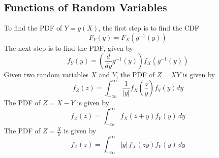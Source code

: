 \documentclass[nobib]{tufte-handout}
\begin{document}
\subsection{Functions of Random Variables}
To find the PDF of $Y = g(X)$, the first
step is to find the CDF
\begin{equation}
    F_Y(y) = F_X(g^{-1}(y))
\end{equation}
The next step is to find the PDF, given by
\begin{equation}
    f_Y(y) = \left(\frac{d}{dy}g^{-1}(y)\right)f_X(g^{-1}(y))
\end{equation}
Given two random variables $X$ and $Y$, the
PDF of $Z = XY$ is given by
\begin{equation}
    f_Z(z) = \int_{-\infty}^{\infty} \frac{1}{|y|} f_X(\frac{z}{y}) f_Y(y) dy
\end{equation}
The PDF of $Z = X - Y$ is given by
\begin{equation}
    f_Z(z) = \int_{-\infty}^{\infty} f_X(z + y) f_Y(y) \, dy
\end{equation}
The PDF of $Z = \frac{X}{Y}$ is given by
\begin{equation}
    f_Z(z) = \int_{-\infty}^{\infty} |y| \, f_X(z y) f_Y(y) \, dy
\end{equation}
\end{document}
